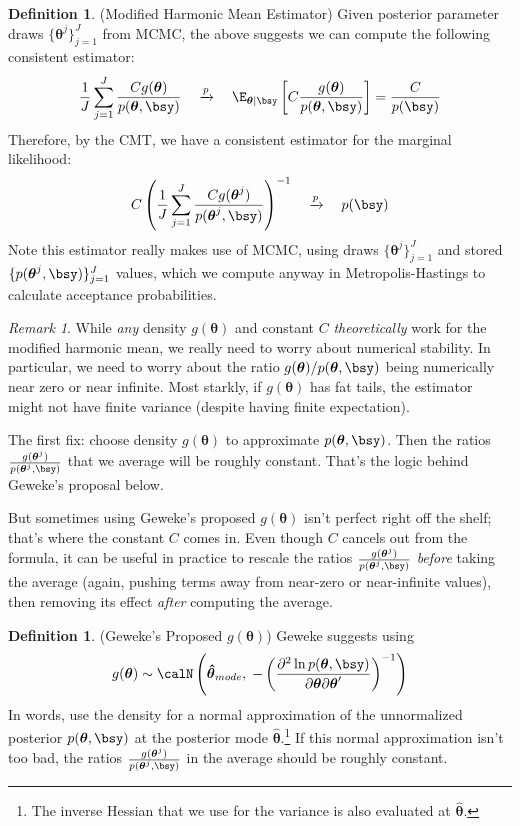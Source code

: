\documentclass[12pt]{article}
\theoremstyle{plain}
\theoremstyle{definition}
\newtheorem{defn}[thm]{Definition}
\theoremstyle{remark}
\newtheorem*{rmk}{Remark}
\newcommand{\bstheta}{\boldsymbol{\theta}}
\newcommand{\bshattheta}{\boldsymbol{\hat{\theta}}}
\newcommand{\pto}{\xrightarrow{p}}
\begin{document}
\begin{defn}(Modified Harmonic Mean Estimator)
Given posterior parameter draws $\{\bstheta^j\}_{j=1}^J$ from MCMC, the
above suggests we can compute the following consistent estimator:
\begin{align*}
  \frac{1}{J}\sum_{j=1}^J
  \frac{Cg(\bstheta)}{p(\bstheta,\bsy)}
  \quad\pto\quad
  \E_{\bstheta|\bsy}\left[
    C\frac{g(\bstheta)}{p(\bstheta,\bsy)}
  \right]
  =
  \frac{C}{p(\bsy)}
\end{align*}
Therefore, by the CMT, we have a consistent estimator for the marginal
likelihood:
\begin{align*}
  C
  \left(
  \frac{1}{J}\sum_{j=1}^J
  \frac{Cg(\bstheta^j)}{p(\bstheta^j,\bsy)}
  \right)^{-1}
  \quad\pto\quad
  p(\bsy)
\end{align*}
Note this estimator really makes use of MCMC, using draws
$\{\bstheta^j\}_{j=1}^J$ and stored $\{p(\bstheta^j,\bsy)\}_{j=1}^J$
values, which we compute anyway in Metropolis-Hastings to calculate
acceptance probabilities.
\end{defn}
\begin{rmk}
While \emph{any} density $g(\bstheta)$ and constant $C$
\emph{theoretically} work for the modified harmonic mean, we really need
to worry about numerical stability.
In particular, we need to worry about the ratio
$g(\bstheta)/p(\bstheta,\bsy)$ being numerically near zero or near
infinite.
Most starkly, if $g(\bstheta)$ has fat tails, the estimator might not
have finite variance (despite having finite expectation).

The first fix: choose density $g(\bstheta)$ to approximate
$p(\bstheta,\bsy)$. Then the ratios
$\frac{g(\bstheta^j)}{p(\bstheta^j,\bsy)}$ that we average will be
roughly constant.  That's the logic behind Geweke's proposal below.

But sometimes using Geweke's proposed $g(\bstheta)$ isn't perfect right
off the shelf; that's where the constant $C$ comes in.
Even though $C$ cancels out from the formula, it can be useful in
practice to rescale the ratios
$\frac{g(\bstheta^j)}{p(\bstheta^j,\bsy)}$ \emph{before} taking the
average (again, pushing terms away from near-zero or near-infinite
values), then removing its effect \emph{after} computing the average.
\end{rmk}

\begin{defn}(Geweke's Proposed $g(\bstheta)$)
Geweke suggests using
\begin{align*}
  g(\bstheta)
  \sim
  \calN\left(
  \bshattheta_{mode},\;
  -\left(
  \frac{\partial^2 \ln
  p(\bstheta,\bsy)}{\partial\bstheta\partial\bstheta'}
  \right)^{-1}
  \right)
\end{align*}
In words, use the density for a normal approximation of the
unnormalized posterior $p(\bstheta,\bsy)$ at the posterior mode
$\bshattheta$.\footnote{%
  The inverse Hessian that we use for the variance is also evaluated at
  $\bshattheta$.
}
If this normal approximation isn't too bad, the ratios
$\frac{g(\bstheta^j)}{p(\bstheta^j,\bsy)}$ in the average should be
roughly constant.
\end{defn}
\end{document}
